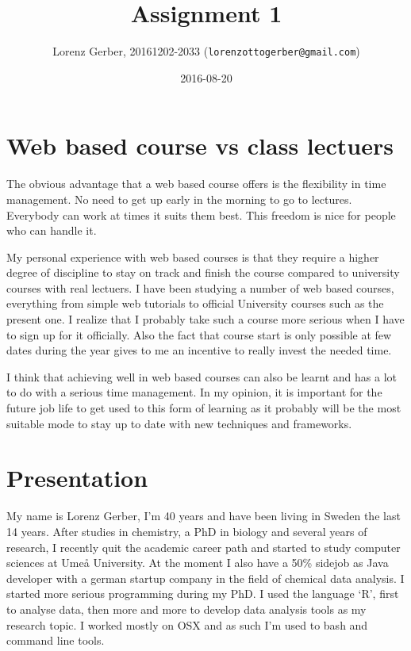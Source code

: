 \documentclass[a4paper,11pt,twoside]{article}
\title{Assignment 1}
\author{Lorenz Gerber, 20161202-2033 ({\tt{lorenzottogerber@gmail.com}})}
\date{2016-08-20}
\begin{document}
\lstset{language=C}
\maketitle
\thispagestyle{empty}
\newpage

\clearpage
{}

\section{Web based course vs class lectuers} 
The obvious advantage that a web based course offers is the flexibility in time management. No need to get up early in the morning to go to lectures. Everybody can work at times it suits them best. This freedom is nice for people who can handle it. 

My personal experience with web based courses is that they require a higher degree of discipline to stay on track and finish the course compared to university courses with real lectuers. I have been studying a number of web based courses, everything from simple web tutorials to official University courses such as the present one. I realize that I probably take such a course more serious when I have to sign up for it officially. Also the fact that course start is only possible at few dates during the year gives to me an incentive to really invest the needed time.

I think that achieving well in web based courses can also be learnt and has a lot to do with a serious time management. In my opinion, it is important for the future job life to get used to this form of learning as it probably will be the most suitable mode to stay up to date with new techniques and frameworks. 


\section{Presentation}
My name is Lorenz Gerber, I'm 40 years and have been living in Sweden the last 14 years. After studies in chemistry, a PhD in biology and several years of research, I recently quit the academic career path and started to study computer sciences at Umeå University. At the moment I also have a 50\% sidejob as Java developer with a german startup company in the field of chemical data analysis. I started more serious programming during my PhD. I used the language `R', first to analyse data, then more and more to develop data analysis tools as my research topic. I worked mostly on OSX and as such I'm used to bash and command line tools.
\end{document}
